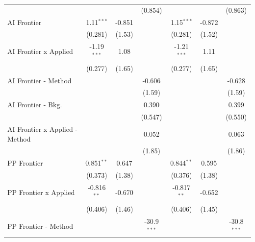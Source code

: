 \begin{tabular}{lcccccc}
                                  &                &               & (0.854)       &                &               & (0.863)\\   
   AI Frontier                    & 1.11$^{***}$   & -0.851        &               & 1.15$^{***}$   & -0.872        &   \\   
                                  & (0.281)        & (1.53)        &               & (0.281)        & (1.52)        &   \\   
   AI Frontier x Applied          & -1.19$^{***}$  & 1.08          &               & -1.21$^{***}$  & 1.11          &   \\   
                                  & (0.277)        & (1.65)        &               & (0.277)        & (1.65)        &   \\   
   AI Frontier - Method           &                &               & -0.606        &                &               & -0.628\\   
                                  &                &               & (1.59)        &                &               & (1.59)\\   
   AI Frontier - Bkg.             &                &               & 0.390         &                &               & 0.399\\   
                                  &                &               & (0.547)       &                &               & (0.550)\\   
   AI Frontier x Applied - Method &                &               & 0.052         &                &               & 0.063\\   
                                  &                &               & (1.85)        &                &               & (1.86)\\   
   PP Frontier                    & 0.851$^{**}$   & 0.647         &               & 0.844$^{**}$   & 0.595         &   \\   
                                  & (0.373)        & (1.38)        &               & (0.376)        & (1.38)        &   \\   
   PP Frontier x Applied          & -0.816$^{**}$  & -0.670        &               & -0.817$^{**}$  & -0.652        &   \\   
                                  & (0.406)        & (1.46)        &               & (0.406)        & (1.45)        &   \\   
   PP Frontier - Method           &                &               & -30.9$^{***}$ &                &               & -30.8$^{***}$\\   

\end{tabular}
